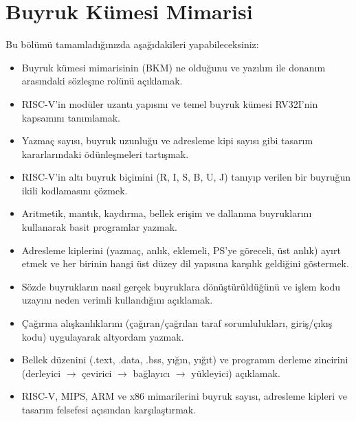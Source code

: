 \chapter{Buyruk Kümesi Mimarisi}
\label{chap:buyruk-kumesi}

\begin{tcolorbox}[
    colback=blokyesil!15,
    colframe=sinyalyesil!60!black,
    title={\textbf{Öğrenme Hedefleri}},
    fonttitle=\bfseries,
    rounded corners,
    boxrule=0.8pt
]
Bu bölümü tamamladığınızda aşağıdakileri yapabileceksiniz:
\begin{itemize}[nosep, leftmargin=*]
    \item Buyruk kümesi mimarisinin (BKM) ne olduğunu ve yazılım ile donanım arasındaki sözleşme rolünü açıklamak.
    \item RISC-V'in modüler uzantı yapısını ve temel buyruk kümesi RV32I'nin kapsamını tanımlamak.
    \item Yazmaç sayısı, buyruk uzunluğu ve adresleme kipi sayısı gibi tasarım kararlarındaki ödünleşmeleri tartışmak.
    \item RISC-V'in altı buyruk biçimini (R, I, S, B, U, J) tanıyıp verilen bir buyruğun ikili kodlamasını çözmek.
    \item Aritmetik, mantık, kaydırma, bellek erişim ve dallanma buyruklarını kullanarak basit programlar yazmak.
    \item Adresleme kiplerini (yazmaç, anlık, eklemeli, PS'ye göreceli, üst anlık) ayırt etmek ve her birinin hangi üst düzey dil yapısına karşılık geldiğini göstermek.
    \item Sözde buyrukların nasıl gerçek buyruklara dönüştürüldüğünü ve işlem kodu uzayını neden verimli kullandığını açıklamak.
    \item Çağırma alışkanlıklarını (çağıran/çağrılan taraf sorumlulukları, giriş/çıkış kodu) uygulayarak altyordam yazmak.
    \item Bellek düzenini (.text, .data, .bss, yığın, yığıt) ve programın derleme zincirini (derleyici $\to$ çevirici $\to$ bağlayıcı $\to$ yükleyici) açıklamak.
    \item RISC-V, MIPS, ARM ve x86 mimarilerini buyruk sayısı, adresleme kipleri ve tasarım felsefesi açısından karşılaştırmak.
\end{itemize}
\end{tcolorbox}

